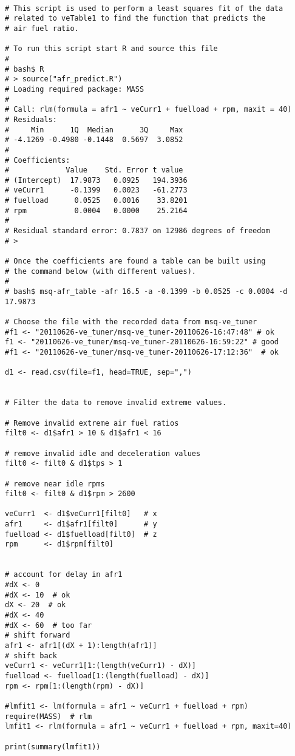 
\begin{verbatim}

# This script is used to perform a least squares fit of the data
# related to veTable1 to find the function that predicts the
# air fuel ratio.

# To run this script start R and source this file
#
# bash$ R
# > source("afr_predict.R")
# Loading required package: MASS
# 
# Call: rlm(formula = afr1 ~ veCurr1 + fuelload + rpm, maxit = 40)
# Residuals:
#     Min      1Q  Median      3Q     Max 
# -4.1269 -0.4980 -0.1448  0.5697  3.0852 
# 
# Coefficients:
#             Value    Std. Error t value 
# (Intercept)  17.9873   0.0925   194.3936
# veCurr1      -0.1399   0.0023   -61.2773
# fuelload      0.0525   0.0016    33.8201
# rpm           0.0004   0.0000    25.2164
# 
# Residual standard error: 0.7837 on 12986 degrees of freedom
# >

# Once the coefficients are found a table can be built using
# the command below (with different values).
#
# bash$ msq-afr_table -afr 16.5 -a -0.1399 -b 0.0525 -c 0.0004 -d 17.9873

# Choose the file with the recorded data from msq-ve_tuner
#f1 <- "20110626-ve_tuner/msq-ve_tuner-20110626-16:47:48" # ok
f1 <- "20110626-ve_tuner/msq-ve_tuner-20110626-16:59:22" # good
#f1 <- "20110626-ve_tuner/msq-ve_tuner-20110626-17:12:36"  # ok

d1 <- read.csv(file=f1, head=TRUE, sep=",")


# Filter the data to remove invalid extreme values.

# Remove invalid extreme air fuel ratios
filt0 <- d1$afr1 > 10 & d1$afr1 < 16

# remove invalid idle and deceleration values
filt0 <- filt0 & d1$tps > 1

# remove near idle rpms
filt0 <- filt0 & d1$rpm > 2600

veCurr1  <- d1$veCurr1[filt0]  	# x
afr1 	 <- d1$afr1[filt0]  	# y
fuelload <- d1$fuelload[filt0]  # z
rpm 	 <- d1$rpm[filt0]


# account for delay in afr1
#dX <- 0
#dX <- 10  # ok
dX <- 20  # ok
#dX <- 40
#dX <- 60  # too far
# shift forward
afr1 <- afr1[(dX + 1):length(afr1)]
# shift back
veCurr1 <- veCurr1[1:(length(veCurr1) - dX)]
fuelload <- fuelload[1:(length(fuelload) - dX)]
rpm <- rpm[1:(length(rpm) - dX)]

#lmfit1 <- lm(formula = afr1 ~ veCurr1 + fuelload + rpm)
require(MASS)  # rlm
lmfit1 <- rlm(formula = afr1 ~ veCurr1 + fuelload + rpm, maxit=40)

print(summary(lmfit1))

\end{verbatim}

